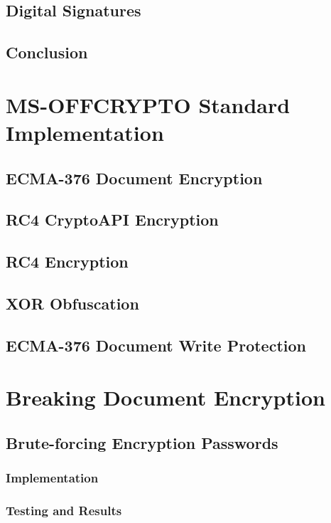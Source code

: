 \documentclass[11pt,oneside]{fithesis2}
\begin{document}
\section{Digital Signatures}

\section{Conclusion}

\chapter{MS-OFFCRYPTO Standard Implementation}

\section{ECMA-376 Document Encryption}

\section{RC4 CryptoAPI Encryption}

\section{RC4 Encryption}

\section{XOR Obfuscation}

\section{ECMA-376 Document Write Protection}

\chapter{Breaking Document Encryption}

\section{Brute-forcing Encryption Passwords}

\subsection{Implementation}

\subsection{Testing and Results}
\end{document}
